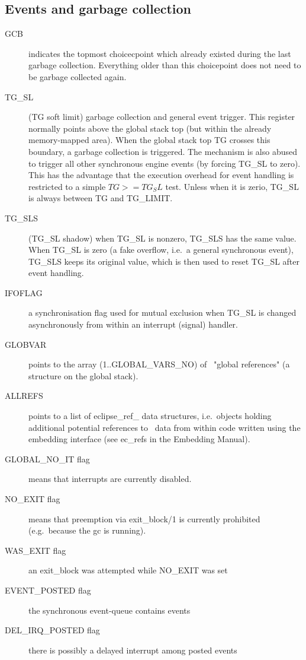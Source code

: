 \subsection{Events and garbage collection}
\begin{description}
\item[GCB] indicates the topmost choicecpoint which already existed
        during the last garbage collection. Everything older than this
        choicepoint does not need to be garbage collected again.
\item[TG_SL] (TG soft limit) garbage collection and general event trigger.
        This register normally points above the global stack top
        (but within the already memory-mapped area). When the global stack
        top TG crosses this boundary, a garbage collection is triggered.
        The mechanism is also abused to trigger all other synchronous
        engine events (by forcing TG_SL to zero).
        This has the advantage that the execution overhead
        for event handling is restricted to a simple $TG >= TG_SL$ test.
        Unless when it is zerio, TG_SL is always between TG and TG_LIMIT.
\item[TG_SLS] (TG_SL shadow) when TG_SL is nonzero, TG_SLS has the same value.
        When TG_SL is zero (a fake overflow, i.e.\ a general synchronous event),
        TG_SLS keeps its original value, which is then used to reset TG_SL
        after event handling.
\item[IFOFLAG] a synchronisation flag used for mutual exclusion when
        TG_SL is changed asynchronously from within an interrupt (signal)
        handler.
\item[GLOBVAR] points to the array (1..GLOBAL_VARS_NO) of \eclipse\
        "global references" (a structure on the global stack).
\item[ALLREFS] points to a list of eclipse_ref_ data structures, i.e.\
        objects holding additional potential references to \eclipse\ data
        from within code written using the embedding interface
        (see ec_refs in the Embedding Manual).
\item[GLOBAL_NO_IT flag] means that interrupts are currently disabled.
\item[NO_EXIT flag] means that preemption via exit_block/1 is currently
        prohibited (e.g.\ because the gc is running).
\item[WAS_EXIT flag] an exit_block was attempted while NO_EXIT was set
\item[EVENT_POSTED flag] the synchronous event-queue contains events
\item[DEL_IRQ_POSTED flag] there is possibly a delayed interrupt among
        posted events
\end{description}


